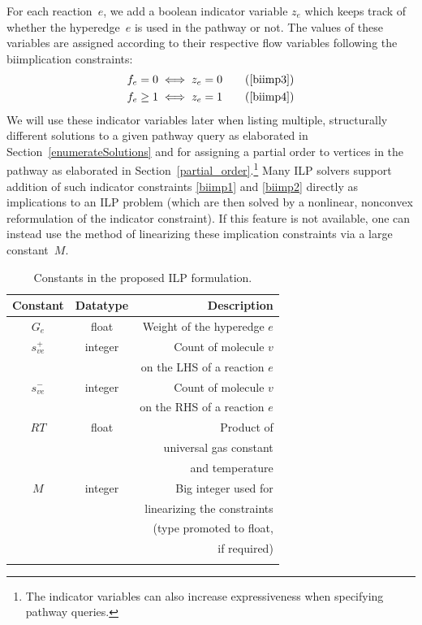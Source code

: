 For each reaction~$e$, we add a boolean indicator variable $z_e$ which keeps track of whether the hyperedge~$e$ is used in the pathway or not. The values of these variables are assigned according to their respective flow variables following the biimplication constraints:
\begin{align}
    f_e = 0 &\iff z_e = 0 \tag{\ref{biimp3}} \\
    f_e \geq 1 &\iff z_e = 1 \tag{\ref{biimp4}}
\end{align}
We will use these indicator variables later when listing multiple, structurally different solutions to a given pathway query as elaborated in Section~\ref{enumerateSolutions} and for assigning a partial order to vertices in the pathway as elaborated in Section~\ref{partial_order}.\footnote{The indicator variables can also increase expressiveness when specifying pathway queries.} Many ILP solvers support addition of such indicator constraints \eqref{biimp1} and \eqref{biimp2} directly as implications to an ILP problem (which are then solved by a nonlinear, nonconvex reformulation of the indicator constraint). If this feature is not available, one can instead use the method of linearizing these implication constraints via a large constant~$M$.

\begin{table}[t]
    \centering
    \begin{footnotesize}
    \begin{tabular}{ccr}
        \\\toprule
        Constant & Datatype & Description \\
        \midrule
        $G_e$ & float & Weight of the hyperedge $e$ \\[1mm]
        $s_{ve}^+$ & integer & Count of molecule $v$ \\
        && on the LHS of a reaction $e$ \\[1mm]
        $s_{ve}^-$ & integer & Count of molecule $v$ \\
        && on the RHS of a reaction $e$ \\[1mm]
        $RT$ & float & Product of \\
        && universal gas constant \\
        && and temperature \\[1mm]
        $M$ & integer & Big integer used for \\
        && linearizing the constraints \\
        && (type promoted to float,\\
        && if required) \\
        \bottomrule\\
    \end{tabular}
    \end{footnotesize}
    \caption{Constants in the proposed ILP formulation.}
    \label{tab: ILP constants}
\end{table}%

